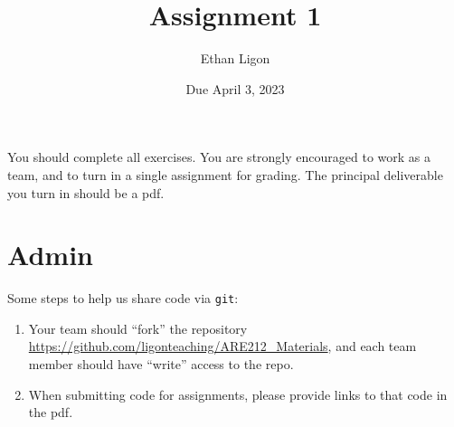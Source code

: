 \documentclass[12pt]{amsart}
\author{Ethan Ligon}
\date{Due April 3, 2023}
\title{Assignment 1}
\begin{document}
\maketitle
You should complete all exercises.   You are strongly encouraged to work as a  team, and to turn in a single assignment for grading.   The principal deliverable you turn in should be a pdf.
\section{Admin}
\label{sec:org94face0}
Some steps to help us share code via \texttt{git}:
\begin{enumerate}
\item Your team should ``fork'' the repository \url{https://github.com/ligonteaching/ARE212\_Materials}, and each  team member should have ``write'' access to the repo.
\item When submitting code for assignments, please provide links to that code in the pdf.
\end{enumerate}
\end{document}
